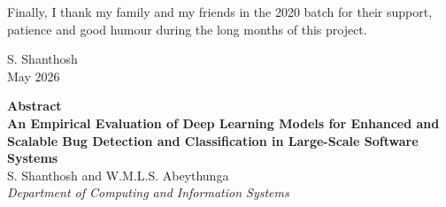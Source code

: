 \documentclass[12pt,a4paper,oneside]{report}
\begin{document}
Finally, I thank my family and my friends in the 2020 batch for their support, patience and good humour during the long months of this project.

\vspace{10mm}
\noindent S. Shanthosh\\
May 2026

\clearpage

\thispagestyle{plain}
\begin{center}
{\fontsize{12}{18}\selectfont\bfseries Abstract}\\[10pt]
{\fontsize{12}{18}\selectfont\bfseries An Empirical Evaluation of Deep Learning Models for Enhanced and Scalable Bug Detection and Classification in Large-Scale Software Systems}\\[12pt]
{\fontsize{10}{14}\selectfont S. Shanthosh and W.M.L.S. Abeythunga}\\[4pt]
{\fontsize{10}{14}\selectfont\itshape Department of Computing and Information Systems}\\[16pt]
\end{center}
\end{document}
